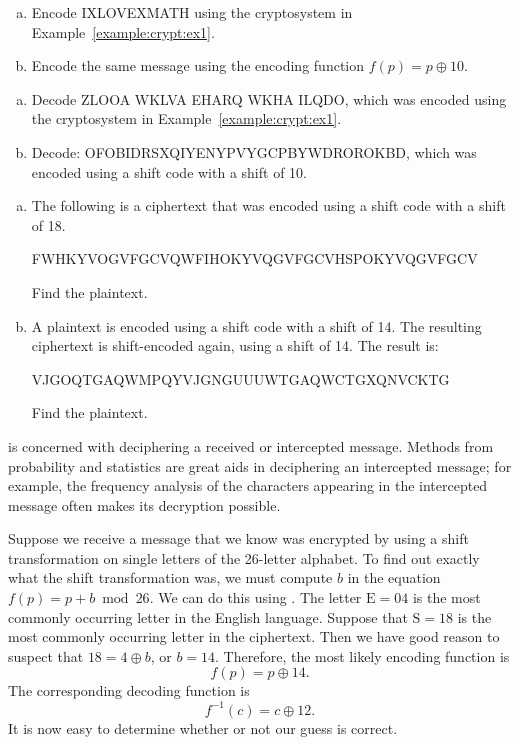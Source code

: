 \begin{exercise}{}
\begin{enumerate}[(a)]
\item
Encode IXLOVEXMATH using the cryptosystem in Example~\ref{example:crypt:ex1}.
\item
Encode the same message using the encoding function $f(p) =p \oplus 10$.
\end{enumerate}
\end{exercise} 
 \medskip

\begin{exercise}{}
\begin{enumerate}[(a)]
\item
Decode ZLOOA WKLVA EHARQ WKHA ILQDO, which was encoded using the
cryptosystem in Example~\ref{example:crypt:ex1}.
\item
Decode: OFOBIDRSXQIYENYPVYGCPBYWDROROKBD, which was encoded using a shift code with a shift of 10.
\end{enumerate}
\end{exercise} 

\begin{exercise}{}  
\begin{enumerate}[(a)]
\item
The following is a ciphertext that was encoded using a shift code with a shift of 18.

FWHKYVOGVFGCVQWFIHOKYVQGVFGCVHSPOKYVQGVFGCV

\noindent
Find the plaintext.
\item
A plaintext is encoded using a shift code with a shift of 14. The resulting ciphertext is shift-encoded again, using a shift of 14. The result is:

VJGOQTGAQWMPQYVJGNGUUUWTGAQWCTGXQNVCKTG

\noindent
Find the plaintext.
\end{enumerate}
\end{exercise}

 is concerned with
deciphering a received or intercepted message. Methods from
probability and statistics are great aids in deciphering an
intercepted message; for example, the frequency analysis of the
characters appearing in the intercepted message often makes its
decryption possible.  
 
\begin{example}{2}
Suppose we receive a message that we know was encrypted by using a
shift transformation on single letters of the 26-letter alphabet. To
find out exactly what the shift transformation was, we must compute
$b$ in the equation $f(p) = p + b \bmod 26$. We can do this using
.  
The letter $\mbox{E} = 04$ is the most commonly
occurring letter in the English language. Suppose that $\mbox{S} = 18$
is the most commonly occurring letter in the ciphertext.  Then we have
good reason to suspect that  $18 = 4 \oplus b $, or $b= 14$.
Therefore, the most likely encoding function is
$$
f(p) = p \oplus 14.
$$
The corresponding decoding function is
$$
f^{-1}(c) = c \oplus 12.
$$
It is now easy to determine whether or not our guess is correct.
\end{example}
 
